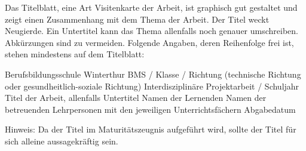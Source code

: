Das Titelblatt, eine Art Visitenkarte der Arbeit, ist graphisch gut gestaltet und zeigt einen Zusammenhang mit dem Thema der Arbeit. Der Titel weckt Neugierde. Ein Untertitel kann das Thema allenfalls noch genauer umschreiben. Abkürzungen sind zu vermeiden. Folgende Angaben, deren Reihenfolge frei ist, stehen mindestens auf dem Titelblatt:

Berufsbildungsschule Winterthur 
BMS / Klasse / Richtung
(technische Richtung oder gesundheitlich-soziale Richtung)
Interdisziplinäre Projektarbeit / Schuljahr
Titel der Arbeit, allenfalls Untertitel
Namen der Lernenden
Namen der betreuenden Lehrpersonen mit den jeweiligen Unterrichtsfächern
Abgabedatum

Hinweis:
Da der Titel im Maturitätszeugnis aufgeführt wird, sollte der Titel für sich alleine aussagekräftig sein.
